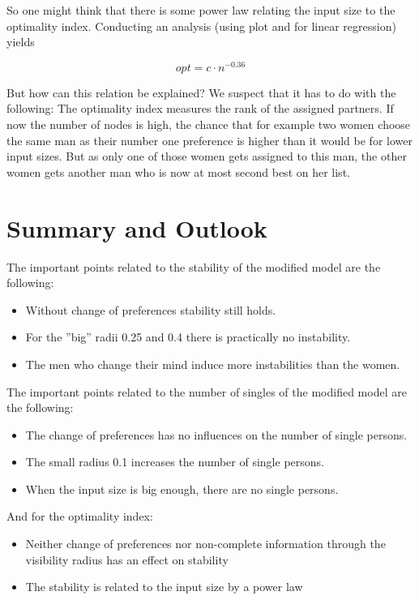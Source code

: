 \documentclass[11pt]{article}
\begin{document}
So one might think that there is some power law relating the input size to the optimality index. Conducting an analysis (using 
plot and  for linear regression) yields

$$opt = c \cdot n^{-0.36}$$

But how can this relation be explained? We suspect that it has to do with the following: The optimality index measures the rank of the
assigned partners. If now the number of nodes is high, the chance that for example two women choose the same man as their number one preference
is higher than it would be for lower input sizes. But as only one of those women gets assigned to this man, the other women gets another man who
is now at most second best on her list.

\newpage
\section{Summary and Outlook}

The important points related to the stability of the modified model are the following:
\begin{itemize}
  \item Without change of preferences stability still holds.
  \item For the ''big'' radii 0.25 and 0.4 there is practically no instability.
  \item The men who change their mind induce more instabilities than the women.
\end{itemize}
The important points related to the number of singles of the modified model are the following:
\begin{itemize}
  \item The change of preferences has no influences on the number of single persons.
  \item The small radius 0.1 increases the number of single persons.
  \item When the input size is big enough, there are no single persons.
\end{itemize}
And for the optimality index:
\begin{itemize}
  \item Neither change of preferences nor non-complete information through the visibility radius has an effect on stability
  \item The stability is related to the input size by a power law
\end{itemize}

\nocite{yt1}
\nocite{yt2}
\end{document}
